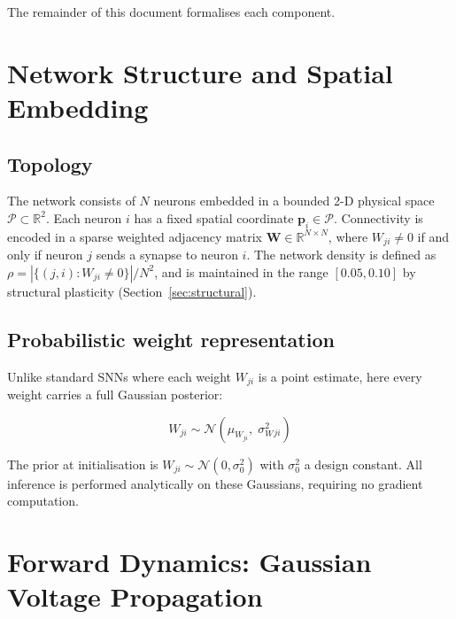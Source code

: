 \documentclass[12pt, a4paper]{article}
\newcommand{\R}{\mathbb{R}}
\newcommand{\Normal}{\mathcal{N}}
\newcommand{\mW}{\mu_{W}}
\newcommand{\sW}{\sigma^{2}_{W}}
\begin{document}
The remainder of this document formalises each component.

\section{Network Structure and Spatial Embedding}
\label{sec:structure}

\subsection{Topology}

The network consists of $N$ neurons embedded in a bounded 2-D physical space
$\mathcal{P} \subset \R^2$. Each neuron $i$ has a fixed spatial coordinate
$\bm{p}_i \in \mathcal{P}$. Connectivity is encoded in a sparse weighted adjacency
matrix $\mathbf{W} \in \R^{N \times N}$, where $W_{ji} \neq 0$ if and only if neuron
$j$ sends a synapse to neuron $i$. The network density is defined as
$\rho = |\{(j,i) : W_{ji} \neq 0\}| / N^2$, and is maintained in the range $[0.05,
0.10]$ by structural plasticity (Section~\ref{sec:structural}).

\subsection{Probabilistic weight representation}

Unlike standard SNNs where each weight $W_{ji}$ is a point estimate, here every weight
carries a full Gaussian posterior:

\begin{equation}
    W_{ji} \sim \Normal\!\left(\mW_{ji},\; \sW_{ji}\right)
    \label{eq:weight_dist}
\end{equation}

The prior at initialisation is $W_{ji} \sim \Normal(0, \sigma^2_0)$ with
$\sigma^2_0$ a design constant. All inference is performed analytically on these
Gaussians, requiring no gradient computation.

\section{Forward Dynamics: Gaussian Voltage Propagation}
\label{sec:forward}
\end{document}
